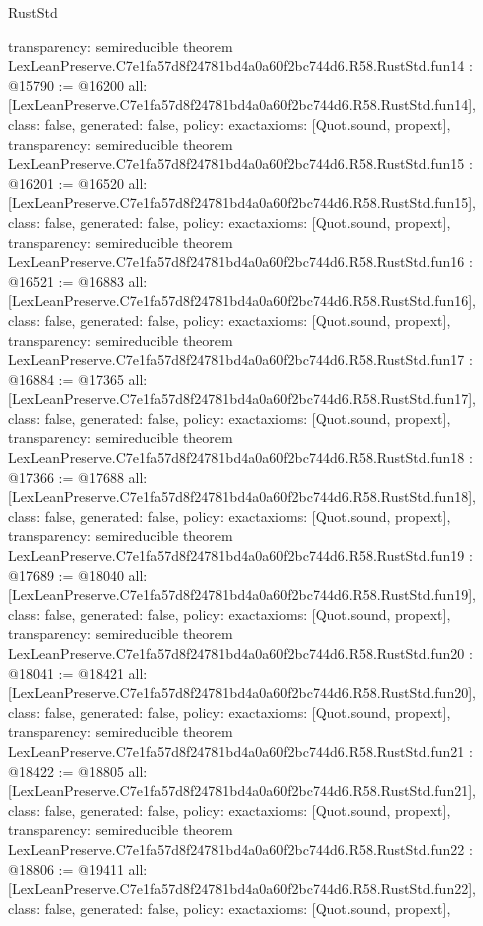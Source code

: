 \begin{lexlean}{RustStd}
\begin{coremodule}
{  transparency: semireducible
}
theorem LexLeanPreserve.C7e1fa57d8f24781bd4a0a60f2bc744d6.R58.RustStd.fun14 : @15790 := @16200 {
  all: [LexLeanPreserve.C7e1fa57d8f24781bd4a0a60f2bc744d6.R58.RustStd.fun14],
  class: false,
  generated: false,
  policy: exact{axioms: [Quot.sound, propext]},
  transparency: semireducible
}
theorem LexLeanPreserve.C7e1fa57d8f24781bd4a0a60f2bc744d6.R58.RustStd.fun15 : @16201 := @16520 {
  all: [LexLeanPreserve.C7e1fa57d8f24781bd4a0a60f2bc744d6.R58.RustStd.fun15],
  class: false,
  generated: false,
  policy: exact{axioms: [Quot.sound, propext]},
  transparency: semireducible
}
theorem LexLeanPreserve.C7e1fa57d8f24781bd4a0a60f2bc744d6.R58.RustStd.fun16 : @16521 := @16883 {
  all: [LexLeanPreserve.C7e1fa57d8f24781bd4a0a60f2bc744d6.R58.RustStd.fun16],
  class: false,
  generated: false,
  policy: exact{axioms: [Quot.sound, propext]},
  transparency: semireducible
}
theorem LexLeanPreserve.C7e1fa57d8f24781bd4a0a60f2bc744d6.R58.RustStd.fun17 : @16884 := @17365 {
  all: [LexLeanPreserve.C7e1fa57d8f24781bd4a0a60f2bc744d6.R58.RustStd.fun17],
  class: false,
  generated: false,
  policy: exact{axioms: [Quot.sound, propext]},
  transparency: semireducible
}
theorem LexLeanPreserve.C7e1fa57d8f24781bd4a0a60f2bc744d6.R58.RustStd.fun18 : @17366 := @17688 {
  all: [LexLeanPreserve.C7e1fa57d8f24781bd4a0a60f2bc744d6.R58.RustStd.fun18],
  class: false,
  generated: false,
  policy: exact{axioms: [Quot.sound, propext]},
  transparency: semireducible
}
theorem LexLeanPreserve.C7e1fa57d8f24781bd4a0a60f2bc744d6.R58.RustStd.fun19 : @17689 := @18040 {
  all: [LexLeanPreserve.C7e1fa57d8f24781bd4a0a60f2bc744d6.R58.RustStd.fun19],
  class: false,
  generated: false,
  policy: exact{axioms: [Quot.sound, propext]},
  transparency: semireducible
}
theorem LexLeanPreserve.C7e1fa57d8f24781bd4a0a60f2bc744d6.R58.RustStd.fun20 : @18041 := @18421 {
  all: [LexLeanPreserve.C7e1fa57d8f24781bd4a0a60f2bc744d6.R58.RustStd.fun20],
  class: false,
  generated: false,
  policy: exact{axioms: [Quot.sound, propext]},
  transparency: semireducible
}
theorem LexLeanPreserve.C7e1fa57d8f24781bd4a0a60f2bc744d6.R58.RustStd.fun21 : @18422 := @18805 {
  all: [LexLeanPreserve.C7e1fa57d8f24781bd4a0a60f2bc744d6.R58.RustStd.fun21],
  class: false,
  generated: false,
  policy: exact{axioms: [Quot.sound, propext]},
  transparency: semireducible
}
theorem LexLeanPreserve.C7e1fa57d8f24781bd4a0a60f2bc744d6.R58.RustStd.fun22 : @18806 := @19411 {
  all: [LexLeanPreserve.C7e1fa57d8f24781bd4a0a60f2bc744d6.R58.RustStd.fun22],
  class: false,
  generated: false,
  policy: exact{axioms: [Quot.sound, propext]},
}
\end{coremodule}
\end{lexlean}

